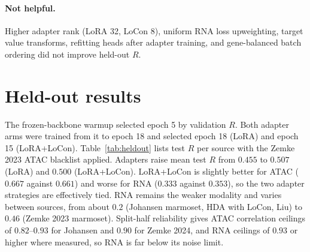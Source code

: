 \documentclass[11pt]{article}
\begin{document}
\paragraph{Not helpful.} Higher adapter rank (LoRA 32, LoCon 8), uniform RNA
loss upweighting, target value transforms, refitting heads after adapter
training, and gene-balanced batch ordering did not improve held-out $R$.

\section{Held-out results}
The frozen-backbone warmup selected epoch 5 by validation $R$. Both adapter
arms were trained from it to epoch 18 and selected epoch 18 (LoRA) and epoch 15
(LoRA+LoCon). Table~\ref{tab:heldout} lists test $R$ per source with the Zemke
2023 ATAC blacklist applied. Adapters raise mean test $R$ from $0.455$ to
$0.507$ (LoRA) and $0.500$ (LoRA+LoCon). LoRA+LoCon is slightly better for ATAC
($0.667$ against $0.661$) and worse for RNA ($0.333$ against $0.353$), so the two
adapter strategies are effectively tied. RNA remains the weaker modality and
varies between sources, from about $0.2$ (Johansen marmoset, HDA with LoCon,
Liu) to $0.46$ (Zemke 2023 marmoset). Split-half reliability gives ATAC
correlation ceilings of $0.82$--$0.93$ for Johansen and $0.90$ for Zemke 2024,
and RNA ceilings of $0.93$ or higher where measured, so RNA is far below its
noise limit.
\end{document}
